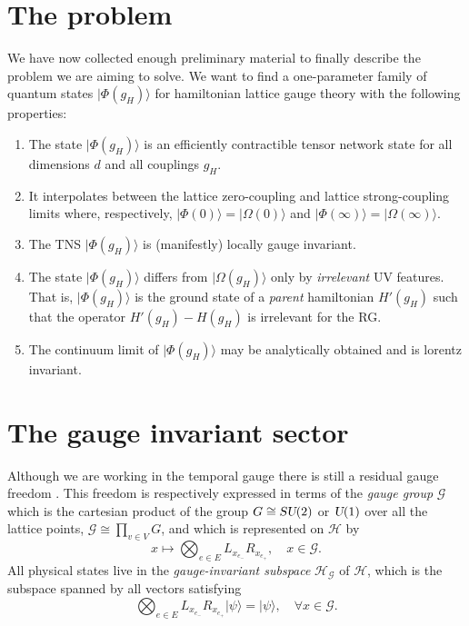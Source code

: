 \documentclass[twocolumn,lengthcheck,superscriptaddress]{revtex4-1}
\def\su2{\textsl{SU}(2)}
\def\uone{\textsl{U}(1)}
\theoremstyle{definition}
\theoremstyle{remark}
\begin{document}
\section{The problem}\label{sec:problem}
We have now collected enough preliminary material to finally describe the problem we are aiming to solve. We want to find a one-parameter family of quantum states $|\Phi(g_H)\rangle$ for hamiltonian lattice gauge theory with the following properties:
\begin{enumerate}
	\item The state $|\Phi(g_H)\rangle$ is an efficiently contractible tensor network state for all dimensions $d$ and all couplings $g_H$.
	\item It interpolates between the lattice zero-coupling and lattice strong-coupling limits where, respectively, $|\Phi(0)\rangle = |\Omega(0)\rangle$ and $|\Phi(\infty)\rangle = |\Omega(\infty)\rangle$. 
	\item The TNS $|\Phi(g_H)\rangle$ is (manifestly) locally gauge invariant.
	\item The state $|\Phi(g_H)\rangle$ differs from $|\Omega(g_H)\rangle$ only by \emph{irrelevant} UV features. That is, $|\Phi(g_H)\rangle$ is the ground state of a \emph{parent} hamiltonian $H'(g_H)$ such that the operator $H'(g_H)-H(g_H)$ is irrelevant for the RG. 
	\item The continuum limit of $|\Phi(g_H)\rangle$ may be analytically obtained and is lorentz invariant.
\end{enumerate} 




\section{The gauge invariant sector}\label{sec:gis}
Although we are working in the temporal gauge there is still a residual gauge freedom \cite{creutz:1985a}. This freedom is respectively expressed in terms of the \emph{gauge group} $\mathcal{G}$ which is the cartesian product of the group $G \cong \su2$ or $\uone$ over all the lattice points, $\mathcal{G}\cong \prod_{v\in V} G$, and which is represented on $\mathcal{H}$ by 
\begin{equation}
	x \mapsto \bigotimes_{e\in E} L_{x_{e_-}}R_{x_{e_+}}, \quad x\in \mathcal{G}.
\end{equation}
All physical states live in the \emph{gauge-invariant subspace} $\mathcal{H}_{\mathcal{G}}$ of $\mathcal{H}$, which is the subspace  spanned by all vectors satisfying
\begin{equation}
	\bigotimes_{e\in E} L_{x_{e_-}}R_{x_{e_+}}|\psi\rangle = |\psi\rangle, \quad \forall x \in \mathcal{G}.
\end{equation}
\end{document}

